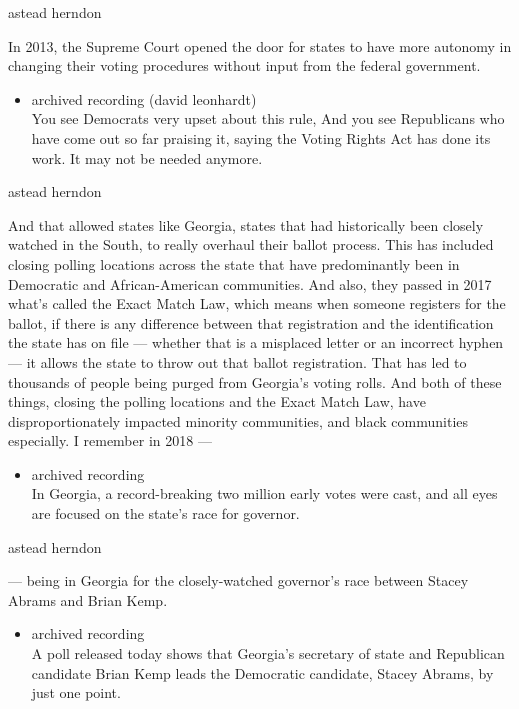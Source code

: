astead herndon

In 2013, the Supreme Court opened the door for states to have more
autonomy in changing their voting procedures without input from the
federal government.

\begin{itemize}
\tightlist
\item
  archived recording (david leonhardt)\\
  You see Democrats very upset about this rule, And you see Republicans
  who have come out so far praising it, saying the Voting Rights Act has
  done its work. It may not be needed anymore.
\end{itemize}

astead herndon

And that allowed states like Georgia, states that had historically been
closely watched in the South, to really overhaul their ballot process.
This has included closing polling locations across the state that have
predominantly been in Democratic and African-American communities. And
also, they passed in 2017 what's called the Exact Match Law, which means
when someone registers for the ballot, if there is any difference
between that registration and the identification the state has on file
--- whether that is a misplaced letter or an incorrect hyphen --- it
allows the state to throw out that ballot registration. That has led to
thousands of people being purged from Georgia's voting rolls. And both
of these things, closing the polling locations and the Exact Match Law,
have disproportionately impacted minority communities, and black
communities especially. I remember in 2018 ---

\begin{itemize}
\tightlist
\item
  archived recording\\
  In Georgia, a record-breaking two million early votes were cast, and
  all eyes are focused on the state's race for governor.
\end{itemize}

astead herndon

--- being in Georgia for the closely-watched governor's race between
Stacey Abrams and Brian Kemp.

\begin{itemize}
\tightlist
\item
  archived recording\\
  A poll released today shows that Georgia's secretary of state and
  Republican candidate Brian Kemp leads the Democratic candidate, Stacey
  Abrams, by just one point.
\end{itemize}

